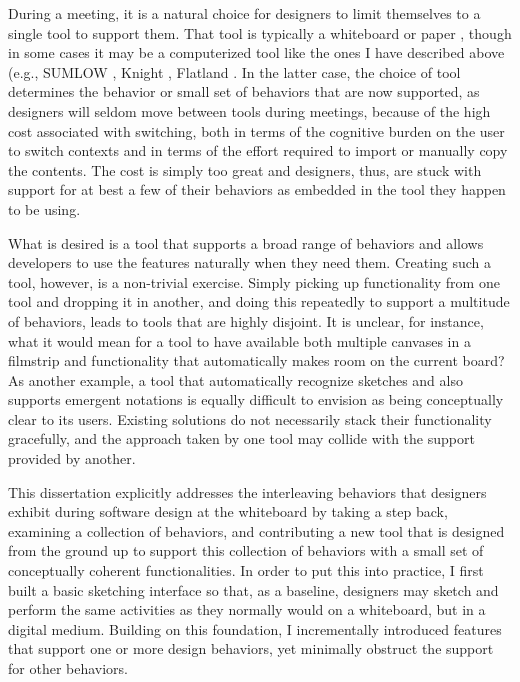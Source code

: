 During a meeting, it is a natural choice for designers to limit themselves to a single tool to support them. That tool is typically a whiteboard or paper \cite{petre2009insights}, though in some cases it may be a computerized tool like the ones I have described above (e.g., SUMLOW \cite{chen2008sumlow}, Knight \cite{damm2000tool}, Flatland \cite{mynatt1999flatland}. In the latter case, the choice of tool determines the behavior or small set of behaviors that are now supported, as designers will seldom move between tools during meetings, because of the high cost associated with switching, both in terms of the cognitive burden on the user to switch contexts and in terms of the effort required to import or manually copy the contents. The cost is simply too great and designers, thus, are stuck with support for at best a few of their behaviors as embedded in the tool they happen to be using.

What is desired is a tool that supports a broad range of behaviors and allows developers to use the features naturally when they need them. Creating such a tool, however, is a non-trivial exercise. Simply picking up functionality from one tool and dropping it in another, and doing this repeatedly to support a multitude of behaviors, leads to tools that are highly disjoint. It is unclear, for instance, what it would mean for a tool to have available both multiple canvases in a filmstrip and functionality that automatically makes room on the current board? As another example, a tool that automatically recognize sketches and also supports emergent notations is equally difficult to envision as being conceptually clear to its users. Existing solutions do not necessarily stack their functionality gracefully, and the approach taken by one tool may collide with the support provided by another.

This dissertation explicitly addresses the interleaving behaviors that designers exhibit during software design at the whiteboard by taking a step back, examining a collection of behaviors, and contributing a new tool that is designed from the ground up to support this collection of behaviors with a small set of conceptually coherent functionalities. In order to put this into practice, I first built a basic sketching interface so that, as a baseline, designers may sketch and perform the same activities as they normally would on a whiteboard, but in a digital medium. Building on this foundation, I incrementally introduced features that support one or more design behaviors, yet minimally obstruct the support for other behaviors. 

